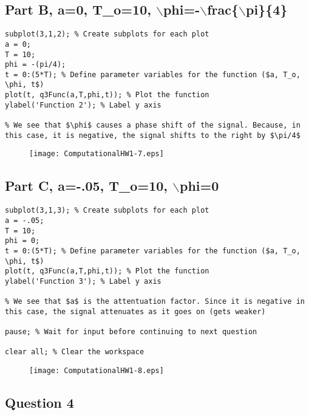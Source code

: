 \documentclass[10pt]{article}
\begin{document}
{}
\subsection*{Part B, a=0, T\_o=10, \ensuremath{\backslash}phi=-\ensuremath{\backslash}frac\{\ensuremath{\backslash}pi\}\{4\}}

\begin{lstlisting}
subplot(3,1,2); % Create subplots for each plot
a = 0;
T = 10;
phi = -(pi/4);
t = 0:(5*T); % Define parameter variables for the function ($a, T_o, \phi, t$)
plot(t, q3Func(a,T,phi,t)); % Plot the function
ylabel('Function 2'); % Label y axis

% We see that $\phi$ causes a phase shift of the signal. Because, in this case, it is negative, the signal shifts to the right by $\pi/4$
\end{lstlisting}
\begin{figure}[H]
\texttt{[image: ComputationalHW1-7.eps]}
\end{figure}


{}
\subsection*{Part C, a=-.05, T\_o=10, \ensuremath{\backslash}phi=0}

\begin{lstlisting}
subplot(3,1,3); % Create subplots for each plot
a = -.05;
T = 10;
phi = 0;
t = 0:(5*T); % Define parameter variables for the function ($a, T_o, \phi, t$)
plot(t, q3Func(a,T,phi,t)); % Plot the function
ylabel('Function 3'); % Label y axis

% We see that $a$ is the attentuation factor. Since it is negative in this case, the signal attenuates as it goes on (gets weaker)

pause; % Wait for input before continuing to next question

clear all; % Clear the workspace
\end{lstlisting}
\begin{figure}[H]
\texttt{[image: ComputationalHW1-8.eps]}
\end{figure}


{}
\subsection*{Question 4}
\end{document}
